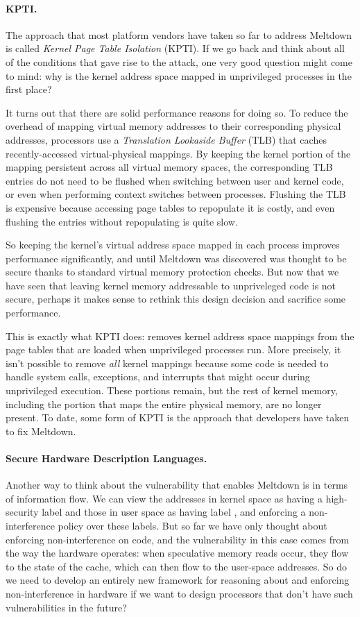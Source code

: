 \documentclass[11pt,twoside]{scrartcl}
\begin{document}
\paragraph{KPTI.} The approach that most platform vendors have taken so far to address Meltdown is called \emph{Kernel Page Table Isolation} (KPTI). If we go back and think about all of the conditions that gave rise to the attack, one very good question might come to mind: why is the kernel address space mapped in unprivileged processes in the first place?

It turns out that there are solid performance reasons for doing so. To reduce the overhead of mapping virtual memory addresses to their corresponding physical addresses, processors use a \emph{Translation Lookaside Buffer} (TLB) that caches recently-accessed virtual-physical mappings. By keeping the kernel portion of the mapping persistent across all virtual memory spaces, the corresponding TLB entries do not need to be flushed when switching between user and kernel code, or even when performing context switches between processes. Flushing the TLB is expensive because accessing page tables to repopulate it is costly, and even flushing the entries without repopulating is quite slow. 

So keeping the kernel's virtual address space mapped in each process improves performance significantly, and until Meltdown was discovered was thought to be secure thanks to standard virtual memory protection checks. But now that we have seen that leaving kernel memory addressable to unpriveleged code is not secure, perhaps it makes sense to rethink this design decision and sacrifice some performance.

This is exactly what KPTI does: removes kernel address space mappings from the page tables that are loaded when unprivileged processes run. More precisely, it isn't possible to remove \emph{all} kernel mappings because some code is needed to handle system calls, exceptions, and interrupts that might occur during unprivileged execution. These portions remain, but the rest of kernel memory, including the portion that maps the entire physical memory, are no longer present. To date, some form of KPTI is the approach that developers have taken to fix Meltdown.

\paragraph{Secure Hardware Description Languages.} Another way to think about the vulnerability that enables Meltdown is in terms of information flow. We can view the addresses in kernel space as having a high-security label \hisec and those in user space as having label \lowsec, and enforcing a non-interference policy over these labels. But so far we have only thought about enforcing non-interference on code, and the vulnerability in this case comes from the way the hardware operates: when speculative memory reads occur, they flow to the state of the cache, which can then flow to the \lowsec user-space addresses. So do we need to develop an entirely new framework for reasoning about and enforcing non-interference in hardware if we want to design processors that don't have such vulnerabilities in the future?
\end{document}
